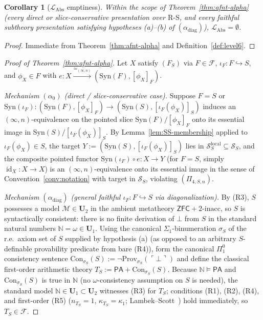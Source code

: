 \documentclass[11pt]{article}
\theoremstyle{plain}
\newtheorem{corollary}[theorem]{Corollary}
\theoremstyle{definition}
\newcommand{\RS}{\mathrm{R\text{-}S}}
\newcommand{\cS}{\mathcal{S}}
\newcommand{\cF}{\mathcal{F}}
\newcommand{\cM}{\mathcal{M}}
\newcommand{\LAbs}{\mathcal{L}_{\mathrm{Abs}}}
\newcommand{\Syn}{\mathrm{Syn}}
\newcommand{\Con}{\mathrm{Con}}
\newcommand{\PA}{\mathsf{PA}}
\newcommand{\ZFC}{\mathsf{ZFC}}
\DeclareMathOperator{\id}{id}
\begin{document}
\begin{corollary}[$\LAbs$ emptiness]\label{cor:level6-empty-alpha}
Within the scope of Theorem~\ref{thm:afnt-alpha} (every direct or slice-conservative presentation over $\RS$, and every faithful subtheory presentation satisfying hypotheses (a)--(b) of $(\alpha_{\mathrm{diag}})$), $\LAbs = \emptyset$.
\end{corollary}

\begin{proof}
Immediate from Theorem~\ref{thm:afnt-alpha} and Definition~\ref{def:level6}.
\end{proof}

\begin{proof}[Proof of Theorem~\ref{thm:afnt-alpha}]
Let $X$ satisfy $(F_S)$ via $F \in \cF$, $\iota_F : F \hookrightarrow S$, and $\phi_X \in F$ with $e : X \xrightarrow{\simeq_{(\infty, n)}} (\Syn(F), [\phi_X]_F)$.

\emph{Mechanism $(\alpha_0)$ (direct / slice-conservative case).} Suppose $F = S$ or $\Syn(\iota_F) : (\Syn(F), [\phi_X]_F) \to (\Syn(S), [\iota_F(\phi_X)]_S)$ induces an $(\infty, n)$-equivalence on the pointed slice $\Syn(F)/[\phi_X]_F$ onto its essential image in $\Syn(S)/[\iota_F(\phi_X)]_S$. By Lemma~\ref{lem:SS-membership} applied to $\iota_F(\phi_X) \in S$, the target $Y := (\Syn(S), [\iota_F(\phi_X)]_S)$ lies in $\cS_S^{\mathrm{local}} \subseteq \cS_S$, and the composite pointed functor $\Syn(\iota_F) \circ e : X \to Y$ (for $F = S$, simply $\id_X : X \to X$) is an $(\infty, n)$-equivalence onto its essential image in the sense of Convention~\ref{conv:notation} with target in $\cS_S$, violating $(\Pi_{4, S, n})$.

\emph{Mechanism $(\alpha_{\mathrm{diag}})$ (general faithful $\iota_F : F \hookrightarrow S$ via diagonalization).} By (R3), $S$ possesses a model $\cM \in \mathbf{U}_2$ in the ambient metatheory $\ZFC + 2\text{-inacc}$, so $S$ is syntactically consistent: there is no finite derivation of $\bot$ from $S$ in the standard natural numbers $\mathbb{N} = \omega \in \mathbf{U}_1$. Using the canonical $\Sigma_1$-binumeration $\sigma_S$ of the r.e.\ axiom set of $S$ supplied by hypothesis (a) (as opposed to an arbitrary $S$-definable provability predicate from bare (R4)), form the canonical $\Pi_1^0$ consistency sentence $\Con_{\sigma_S}(S) := \neg\mathrm{Prov}_{\sigma_S}(\ulcorner \bot \urcorner)$ and define the classical first-order arithmetic theory $T_S := \PA + \Con_{\sigma_S}(S)$. Because $\mathbb{N} \models \PA$ and $\Con_{\sigma_S}(S)$ is true in $\mathbb{N}$ (no $\omega$-consistency assumption on $S$ is needed), the standard model $\mathbb{N} \in \mathbf{U}_1 \subset \mathbf{U}_2$ witnesses (R3) for $T_S$; conditions (R1), (R2), (R4), and first-order (R5) ($n_{T_S} = 1$, $\kappa_{T_S} = \kappa_1$; Lambek--Scott~\cite{LambekScott1986}) hold immediately, so $T_S \in \cF$.


\end{proof}
\end{document}
